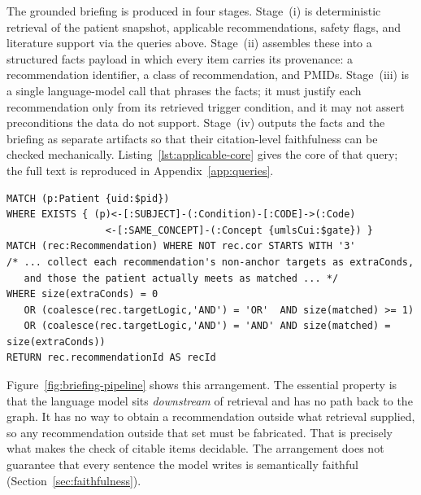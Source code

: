 The grounded briefing is produced in four stages. Stage~(i) is deterministic retrieval of
the patient snapshot, applicable recommendations, safety flags, and literature support via
the queries above. Stage~(ii) assembles these into a structured facts payload in which every
item carries its provenance: a recommendation identifier, a class of recommendation, and
PMIDs. Stage~(iii) is a single language-model call that phrases the facts; it must justify
each recommendation only from its retrieved trigger condition, and it may not assert
preconditions the data do not support. Stage~(iv) outputs the facts and the briefing as
separate artifacts so that their citation-level faithfulness can be checked mechanically. Listing~\ref{lst:applicable-core} gives the core of that query; the full text is
reproduced in Appendix~\ref{app:queries}.
\begin{lstlisting}[caption={Core of the applicable-recommendation query: the CCD gate, then
target matching under the recommendation's own conjunction/disjunction flag.},
label={lst:applicable-core}]
MATCH (p:Patient {uid:$pid})
WHERE EXISTS { (p)<-[:SUBJECT]-(:Condition)-[:CODE]->(:Code)
                 <-[:SAME_CONCEPT]-(:Concept {umlsCui:$gate}) }
MATCH (rec:Recommendation) WHERE NOT rec.cor STARTS WITH '3'
/* ... collect each recommendation's non-anchor targets as extraConds,
   and those the patient actually meets as matched ... */
WHERE size(extraConds) = 0
   OR (coalesce(rec.targetLogic,'AND') = 'OR'  AND size(matched) >= 1)
   OR (coalesce(rec.targetLogic,'AND') = 'AND' AND size(matched) = size(extraConds))
RETURN rec.recommendationId AS recId
\end{lstlisting}

Figure~\ref{fig:briefing-pipeline} shows this arrangement. The essential property is that
the language model sits \emph{downstream} of retrieval and has no path back to the graph.
It has no way to obtain a recommendation outside what retrieval supplied, so any
recommendation outside that set must be fabricated. That is precisely what makes the check of
citable items decidable. The arrangement does not guarantee that every sentence the model
writes is semantically faithful (Section~\ref{sec:faithfulness}).

